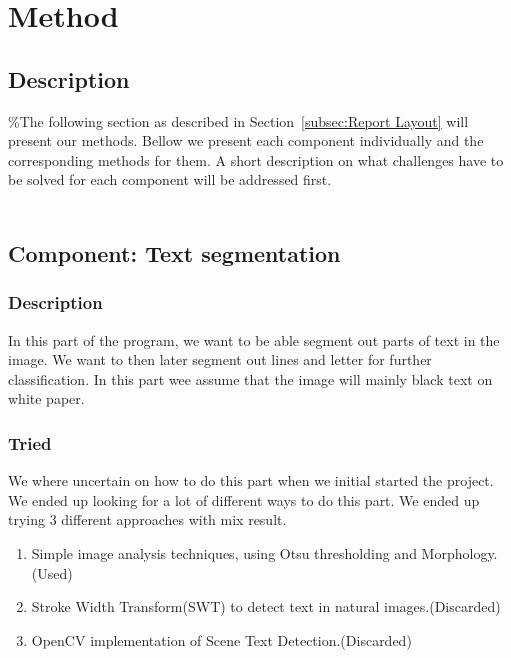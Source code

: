 \documentclass[Report.tex]{subfiles}
\begin{document}
\chapter{Method}
\label{sec:Method}
\section{Description}
\%The following section as described in Section~\ref{subsec:Report Layout} will
present our methods. Bellow we present each component individually and the
corresponding methods for them. A short description on what challenges have to
be solved for each component will be addressed first. \\ \\


\section{Component: Text segmentation}
\label{Method:Text_segmentation}

\subsection{Description}
In this part of the program, we want to be able segment out parts of text in the image. We want to then later segment out lines and letter for further classification. In this part wee assume that the image will mainly black text on white paper.

\subsection{Tried}
We where uncertain on how to do this part when we initial started the project. We ended up looking for a lot of different ways to do this part. We ended up trying 3 different approaches with mix result.
\begin{enumerate}
  \item Simple image analysis techniques, using Otsu thresholding and Morphology.(Used)
  \item Stroke Width Transform(SWT) to detect text in natural images.(Discarded)
  \item OpenCV implementation of Scene Text Detection.(Discarded)
\end{enumerate}
\end{document}
